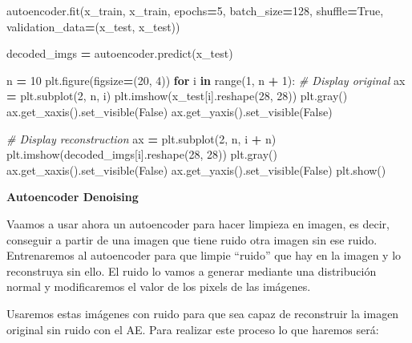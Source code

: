 \documentclass[
  a4paper,
  DIV=11,
  numbers=noendperiod]{scrreprt}
\newenvironment{Shaded}{\begin{snugshade}}{\end{snugshade}}
\newcommand{\BuiltInTok}[1]{#1}
\newcommand{\CommentTok}[1]{\textcolor[rgb]{0.56,0.35,0.01}{\textit{#1}}}
\newcommand{\ControlFlowTok}[1]{\textcolor[rgb]{0.13,0.29,0.53}{\textbf{#1}}}
\newcommand{\DecValTok}[1]{\textcolor[rgb]{0.00,0.00,0.81}{#1}}
\newcommand{\KeywordTok}[1]{\textcolor[rgb]{0.13,0.29,0.53}{\textbf{#1}}}
\newcommand{\NormalTok}[1]{#1}
\newcommand{\OperatorTok}[1]{\textcolor[rgb]{0.81,0.36,0.00}{\textbf{#1}}}
\newcommand{\VariableTok}[1]{\textcolor[rgb]{0.00,0.00,0.00}{#1}}
\begin{document}
\begin{Shaded}
\begin{Highlighting}[numbers=left,,]
\NormalTok{autoencoder.fit(x\_train, x\_train,}
\NormalTok{                epochs}\OperatorTok{=}\DecValTok{5}\NormalTok{,}
\NormalTok{                batch\_size}\OperatorTok{=}\DecValTok{128}\NormalTok{,}
\NormalTok{                shuffle}\OperatorTok{=}\VariableTok{True}\NormalTok{,}
\NormalTok{                validation\_data}\OperatorTok{=}\NormalTok{(x\_test, x\_test))}

\NormalTok{decoded\_imgs }\OperatorTok{=}\NormalTok{ autoencoder.predict(x\_test)}

\NormalTok{n }\OperatorTok{=} \DecValTok{10}
\NormalTok{plt.figure(figsize}\OperatorTok{=}\NormalTok{(}\DecValTok{20}\NormalTok{, }\DecValTok{4}\NormalTok{))}
\ControlFlowTok{for}\NormalTok{ i }\KeywordTok{in} \BuiltInTok{range}\NormalTok{(}\DecValTok{1}\NormalTok{, n }\OperatorTok{+} \DecValTok{1}\NormalTok{):}
    \CommentTok{\# Display original}
\NormalTok{    ax }\OperatorTok{=}\NormalTok{ plt.subplot(}\DecValTok{2}\NormalTok{, n, i)}
\NormalTok{    plt.imshow(x\_test[i].reshape(}\DecValTok{28}\NormalTok{, }\DecValTok{28}\NormalTok{))}
\NormalTok{    plt.gray()}
\NormalTok{    ax.get\_xaxis().set\_visible(}\VariableTok{False}\NormalTok{)}
\NormalTok{    ax.get\_yaxis().set\_visible(}\VariableTok{False}\NormalTok{)}

    \CommentTok{\# Display reconstruction}
\NormalTok{    ax }\OperatorTok{=}\NormalTok{ plt.subplot(}\DecValTok{2}\NormalTok{, n, i }\OperatorTok{+}\NormalTok{ n)}
\NormalTok{    plt.imshow(decoded\_imgs[i].reshape(}\DecValTok{28}\NormalTok{, }\DecValTok{28}\NormalTok{))}
\NormalTok{    plt.gray()}
\NormalTok{    ax.get\_xaxis().set\_visible(}\VariableTok{False}\NormalTok{)}
\NormalTok{    ax.get\_yaxis().set\_visible(}\VariableTok{False}\NormalTok{)}
\NormalTok{plt.show()}
\end{Highlighting}
\end{Shaded}

\textbf{Autoencoder Denoising}

Vaamos a usar ahora un autoencoder para hacer limpieza en imagen, es
decir, conseguir a partir de una imagen que tiene ruido otra imagen sin
ese ruido. Entrenaremos al autoencoder para que limpie ``ruido'' que hay
en la imagen y lo reconstruya sin ello. El ruido lo vamos a generar
mediante una distribución normal y modificaremos el valor de los pixels
de las imágenes.

Usaremos estas imágenes con ruido para que sea capaz de reconstruir la
imagen original sin ruido con el AE. Para realizar este proceso lo que
haremos será:
\end{document}
